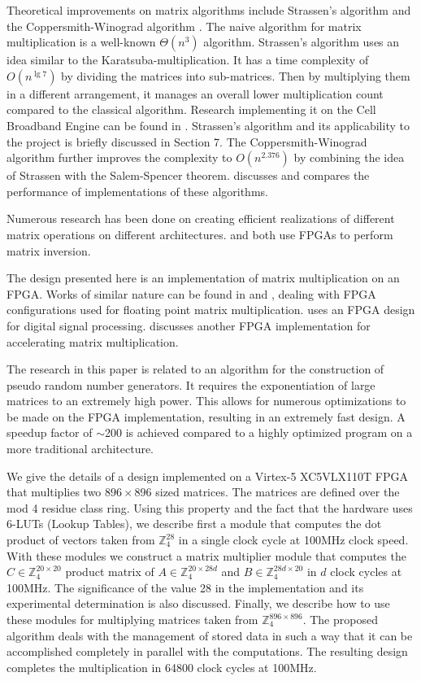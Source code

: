 \documentclass[11pt,twoside]{article}
\begin{document}
Theoretical improvements on matrix algorithms include Strassen's algorithm \cite{c12} and the Coppersmith-Winograd algorithm \cite{c2}. The naive algorithm for matrix multiplication is a well-known $\Theta(n^3)$ algorithm. Strassen's algorithm uses an idea similar to the Karatsuba-multiplication. It has a time complexity of $O(n^{\lg  7})$ by dividing the matrices into sub-matrices. Then by multiplying them in a different arrangement, it manages an overall lower multiplication count compared to the classical algorithm. Research implementing it on the Cell Broadband Engine can be found in \cite{c5}. Strassen's algorithm and its applicability to the project is briefly discussed in Section 7. The Coppersmith-Winograd algorithm further improves the complexity to $O(n^{2.376})$ by combining the idea of Strassen with the Salem-Spencer theorem. \cite{c9} discusses and compares the performance of implementations of these algorithms.

Numerous research has been done on creating efficient realizations of different matrix operations on different architectures. \cite{c8} and \cite{c10} both use FPGAs to perform matrix inversion.

The design presented here is an implementation of matrix multiplication on an FPGA. Works of similar nature can be found in \cite{c1} and \cite{c4}, dealing with FPGA configurations used for floating point matrix multiplication. \cite{c11} uses an FPGA design for digital signal processing. \cite{c3} discusses another FPGA implementation for accelerating matrix multiplication.

The research in this paper is related to an algorithm for the construction of pseudo random number generators. It requires the exponentiation of large matrices to an extremely high power. This allows for numerous optimizations to be made on the FPGA implementation, resulting in an extremely fast design. A speedup factor of  $\sim$200 is achieved compared to a highly optimized program on a more traditional architecture.

We give the details of a design implemented on a Virtex-5 XC5VLX110T FPGA that multiplies two $896 \times 896$ sized matrices. The matrices are defined over the mod 4 residue class ring. Using this property and the fact that the hardware uses 6-LUTs (Lookup Tables), we describe first a module that computes the dot product of vectors taken from $\mathbb{Z}_4^{28}$ in a single clock cycle at 100MHz clock speed. With these modules we construct a matrix multiplier module that computes the $C \in \mathbb{Z}_4^{20 \times 20}$ product matrix of $A \in \mathbb{Z}_4^{20 \times 28d}$ and $B \in \mathbb{Z}_4^{28d \times 20}$ in $d$ clock cycles at 100MHz. The significance of the value 28 in the implementation and its experimental determination is also discussed. Finally, we describe how to use these modules for multiplying matrices taken from $\mathbb{Z}_4^{896 \times 896}$. The proposed algorithm deals with the management of stored data in such a way that it can be accomplished completely in parallel with the computations. The resulting design completes the multiplication in 64800 clock cycles at 100MHz.
\end{document}
